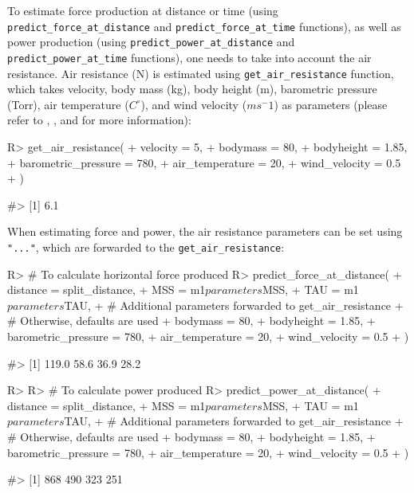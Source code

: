 \documentclass[
]{jss}
\begin{document}
To estimate force production at distance or time (using \texttt{predict\_force\_at\_distance} and \texttt{predict\_force\_at\_time} functions), as well as power production (using \texttt{predict\_power\_at\_distance} and \texttt{predict\_power\_at\_time} functions), one needs to take into account the air resistance. Air resistance (N) is estimated using \texttt{get\_air\_resistance} function, which takes velocity, body mass (kg), body height (m), barometric pressure (Torr), air temperature (\(C^\circ\)), and wind velocity (\(ms^-1\)) as parameters (please refer to \citet{arsacModelingEnergetics100m2002}, \citet{samozinoSimpleMethodMeasuring2016}, and \citet{vaningenschenauCanCyclePower1991} for more information):

\begin{CodeChunk}
\begin{CodeInput}
R> get_air_resistance(
+   velocity = 5,
+   bodymass = 80,
+   bodyheight = 1.85,
+   barometric_pressure = 780,
+   air_temperature = 20,
+   wind_velocity = 0.5
+ )
\end{CodeInput}
\begin{CodeOutput}
#> [1] 6.1
\end{CodeOutput}
\end{CodeChunk}

When estimating force and power, the air resistance parameters can be set using \texttt{"..."}, which are forwarded to the \texttt{get\_air\_resistance}:

\begin{CodeChunk}
\begin{CodeInput}
R> # To calculate horizontal force produced
R> predict_force_at_distance(
+   distance = split_distance,
+   MSS = m1$parameters$MSS,
+   TAU = m1$parameters$TAU,
+   # Additional parameters forwarded to get_air_resistance
+   # Otherwise, defaults are used
+   bodymass = 80,
+   bodyheight = 1.85,
+   barometric_pressure = 780,
+   air_temperature = 20,
+   wind_velocity = 0.5
+ )
\end{CodeInput}
\begin{CodeOutput}
#> [1] 119.0  58.6  36.9  28.2
\end{CodeOutput}
\begin{CodeInput}
R> 
R> # To calculate power produced
R> predict_power_at_distance(
+   distance = split_distance,
+   MSS = m1$parameters$MSS,
+   TAU = m1$parameters$TAU,
+   # Additional parameters forwarded to get_air_resistance
+   # Otherwise, defaults are used
+   bodymass = 80,
+   bodyheight = 1.85,
+   barometric_pressure = 780,
+   air_temperature = 20,
+   wind_velocity = 0.5
+ )
\end{CodeInput}
\begin{CodeOutput}
#> [1] 868 490 323 251
\end{CodeOutput}
\end{CodeChunk}
\end{document}
